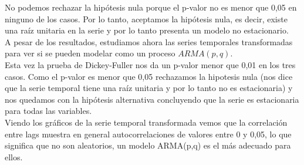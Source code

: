 \documentclass[a4paper,]{article}
\begin{document}

No podemos rechazar la hipótesis nula porque el p-valor no es menor que 0,05 en ninguno de los casos. Por lo tanto, aceptamos la hipótesis nula, es decir, existe una raíz unitaria en la serie y por lo tanto presenta un modelo no estacionario.\\
A pesar de los resultados, estudiamos ahora las series temporales transformadas para ver si se pueden modelar como un proceso $ARMA(p,q)$. \\

Esta vez la prueba de Dickey-Fuller nos da un p-valor menor que 0,01 en los tres casos. Como el p-valor es menor que 0,05 rechazamos la hipotesis nula (nos dice que la serie temporal tiene una raíz unitaria y por lo tanto no es estacionaria) y nos quedamos con la hipótesis alternativa concluyendo que la serie es estacionaria para todas las variables.\\



Viendo los gráficos de la serie temporal transformada vemos que la correlación entre lags muestra en general autocorrelaciones de valores entre 0 y 0,05, lo que significa que no son aleatorios, un modelo ARMA(p,q) es el más adecuado para ellos.\\
\end{document}
